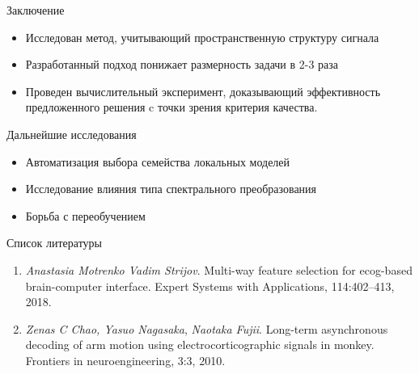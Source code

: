 \documentclass[9pt,pdf,hyperref={unicode}]{beamer}
\begin{document}
\begin{frame}{Заключение}
\begin{itemize}
	\item Исследован метод, учитывающий пространственную структуру сигнала
	\item Разработанный подход понижает размерность задачи в 2-3 раза
	\item Проведен вычислительный эксперимент, доказывающий эффективность предложенного решения c точки зрения критерия качества. 
\end{itemize}
\end{frame}
\begin{frame}{Дальнейшие исследования}
\begin{itemize}
	\item  Автоматизация выбора семейства локальных моделей
	\item Исследование влияния типа спектрального преобразования
	\item Борьба с переобучением
\end{itemize}
\end{frame}
\begin{frame}{Список литературы}
\begin{enumerate}
	\item \textit{Anastasia Motrenko Vadim Strijov}. Multi-way feature selection for ecog-based brain-computer
	interface. Expert Systems with Applications, 114:402–413, 2018.
	\item \textit{Zenas C Chao, Yasuo Nagasaka},  \textit{Naotaka Fujii}. Long-term asynchronous decoding of arm
	motion using electrocorticographic signals in monkey. Frontiers in neuroengineering, 3:3, 2010.
\end{enumerate}
\end{frame}
\end{document}
